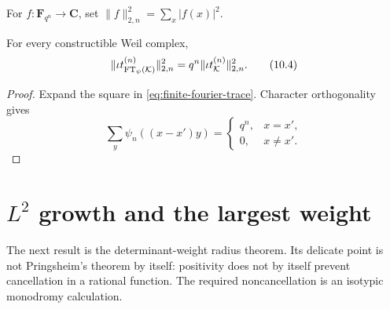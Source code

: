For \(f:\mathbf F_{q^n}\to\mathbf C\), set
\(\|f\|_{2,n}^2=\sum_x|f(x)|^2\).

\begin{theorem}[Plancherel]
\label{thm:fourier-plancherel}
For every constructible Weil complex,
\[
 \|\iota t_{\operatorname{FT}_\psi(\mathcal K)}^{(n)}\|_{2,n}^2
 =
 q^n\|\iota t_{\mathcal K}^{(n)}\|_{2,n}^2.
\tag{10.4}\label{eq:plancherel}
\]
\end{theorem}

\begin{proof}
Expand the square in \cref{eq:finite-fourier-trace}.  Character
orthogonality gives
\[
 \sum_y\psi_n((x-x')y)
 =\begin{cases}q^n,&x=x',\\0,&x\ne x'.\end{cases}
\]
\end{proof}

\section{\texorpdfstring{\(L^2\)}{L2} growth and the largest weight}

The next result is the determinant-weight radius theorem.  Its delicate
point is not Pringsheim's theorem by itself: positivity does not by
itself prevent cancellation in a rational function.  The required
noncancellation is an isotypic monodromy calculation.

